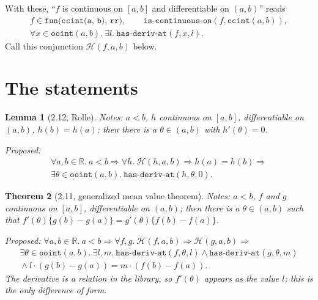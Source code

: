 \documentclass[11pt]{article}
\newtheorem{thm}{Theorem}
\newtheorem{lem}[thm]{Lemma}
\theoremstyle{definition}
\newcommand{\vnb}[1]{\texttt{#1}}
\begin{document}
With these, ``$f$ is continuous on $[a,b]$ and differentiable on $(a,b)$'' reads
\begin{gather*}
f \in \vnb{fun(ccint(a, b), rr)},\qquad \vnb{is-continuous-on}(f, \vnb{ccint}(a,b)),\\
\forall x \in \vnb{ooint}(a,b).\ \exists l.\ \vnb{has-deriv-at}(f, x, l).
\end{gather*}
Call this conjunction $\mathcal{H}(f, a, b)$ below.

\section{The statements}

\begin{lem}[2.12, Rolle]
\emph{Notes:} $a < b$, $h$ continuous on $[a,b]$, differentiable on $(a,b)$, $h(b) = h(a)$; then
there is a $\theta \in (a,b)$ with $h'(\theta) = 0$.

\emph{Proposed:}
\begin{gather*}
\forall a, b \in \mathbb{R}.\ a < b \Rightarrow \forall h.\ \mathcal{H}(h, a, b) \Rightarrow h(a) = h(b)
\Rightarrow\\ \exists \theta \in \vnb{ooint}(a,b).\ \vnb{has-deriv-at}(h, \theta, 0).
\end{gather*}
\end{lem}

\begin{thm}[2.11, generalized mean value theorem]
\emph{Notes:} $a < b$, $f$ and $g$ continuous on $[a,b]$, differentiable on $(a,b)$; then there is a
$\theta \in (a,b)$ such that $f'(\theta)\{g(b) - g(a)\} = g'(\theta)\{f(b) - f(a)\}$.

\emph{Proposed:}
$\forall a, b \in \mathbb{R}.\ a < b \Rightarrow \forall f, g.\ \mathcal{H}(f, a, b) \Rightarrow
\mathcal{H}(g, a, b) \Rightarrow$
\begin{gather*}
\exists \theta \in \vnb{ooint}(a,b).\ \exists l, m.\ \vnb{has-deriv-at}(f, \theta, l) \wedge
\vnb{has-deriv-at}(g, \theta, m)\\ {}\wedge l \cdot (g(b) - g(a)) = m \cdot (f(b) - f(a)).
\end{gather*}
The derivative is a relation in the library, so $f'(\theta)$ appears as the value $l$; this is the
only difference of form.
\end{thm}
\end{document}
